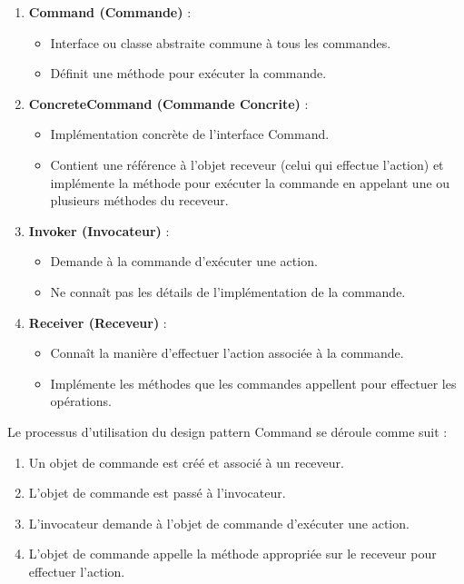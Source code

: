 \begin{enumerate}[leftmargin=*,labelsep=3mm]
    \item \textbf{Command (Commande)} :
    \begin{itemize}
        \item Interface ou classe abstraite commune à tous les commandes.
        \item Définit une méthode pour exécuter la commande.
    \end{itemize}
    
    \item \textbf{ConcreteCommand (Commande Concrite)} :
    \begin{itemize}
        \item Implémentation concrète de l'interface Command.
        \item Contient une référence à l'objet receveur (celui qui effectue l'action) et implémente la méthode pour exécuter la commande en appelant une ou plusieurs méthodes du receveur.
    \end{itemize}
    
    \item \textbf{Invoker (Invocateur)} :
    \begin{itemize}
        \item Demande à la commande d'exécuter une action.
        \item Ne connaît pas les détails de l'implémentation de la commande.
    \end{itemize}
    
    \item \textbf{Receiver (Receveur)} :
    \begin{itemize}
        \item Connaît la manière d'effectuer l'action associée à la commande.
        \item Implémente les méthodes que les commandes appellent pour effectuer les opérations.
    \end{itemize}
\end{enumerate}

Le processus d'utilisation du design pattern Command se déroule comme suit :

\begin{enumerate}[leftmargin=*,labelsep=3mm]
    \item Un objet de commande est créé et associé à un receveur.
    \item L'objet de commande est passé à l'invocateur.
    \item L'invocateur demande à l'objet de commande d'exécuter une action.
    \item L'objet de commande appelle la méthode appropriée sur le receveur pour effectuer l'action.
\end{enumerate}

